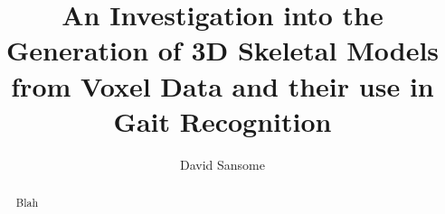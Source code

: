 \documentclass[a4paper,10pt]{article}
\title{An Investigation into the Generation of 3D Skeletal Models from Voxel Data and their use in Gait Recognition}
\author{David Sansome}
\begin{document}


\maketitle

\bigskip
\begin{abstract}
	Blah
\end{abstract}

\newpage

\tableofcontents





\newpage

\end{document}
